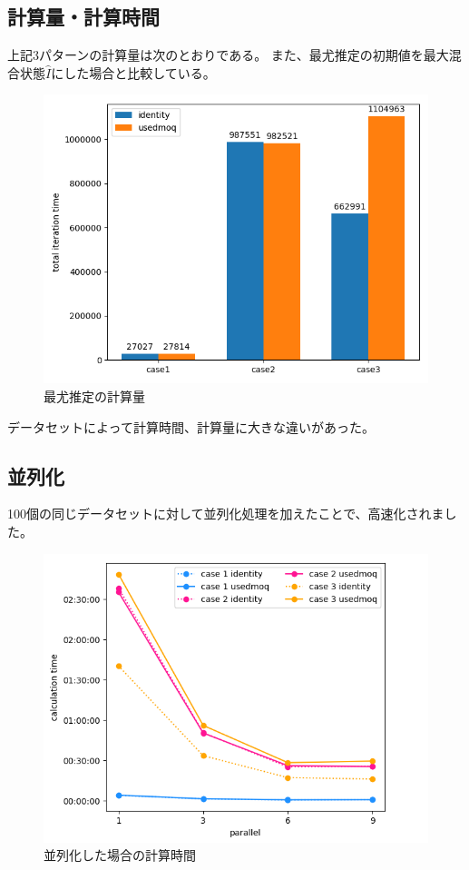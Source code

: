 \documentclass[11pt,a4j,notitlepage]{jreport}
\begin{document}
	\newpage

	\subsection*{計算量・計算時間}

	上記3パターンの計算量は次のとおりである。
	また、最尤推定の初期値を最大混合状態$\hat{I}$にした場合と比較している。

	\begin{figure}[htbp]
		\centering
			\includegraphics[clip,width=12.0cm]{./picture/cg.png}
			\caption{最尤推定の計算量}
	\end{figure}

	データセットによって計算時間、計算量に大きな違いがあった。

	\newpage

	\subsection*{並列化}

	100個の同じデータセットに対して並列化処理を加えたことで、高速化されました。

	\begin{figure}[htbp]
		\centering
			\includegraphics[clip,width=12.0cm]{./picture/parallel.png}
			\caption{並列化した場合の計算時間}
	\end{figure}
\end{document}
